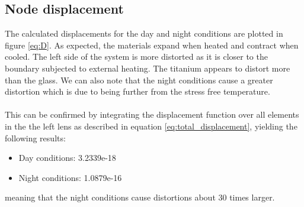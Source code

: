 \documentclass[a4paper,11pt]{article}
\begin{document}
\subsection{Node displacement}
The calculated displacements for the day and night conditions are plotted in figure \ref{eq:D}. As expected, the materials expand when heated and contract when cooled. The left side of the system is more distorted as it is closer to the boundary subjected to external heating. The titanium appears to distort more than the glass. We can also note that the night conditions cause a greater distortion which is due to being further from the stress free temperature. 
\\ \\
This can be confirmed by integrating the displacement function over all elements in the the left lens as described in equation \ref{eq:total_displacement}, yielding the following results:
\begin{itemize}
    \item Day conditions: 3.2339e-18
    \item Night conditions: 1.0879e-16
\end{itemize}
meaning that the night conditions cause distortions about 30 times larger.
\end{document}
